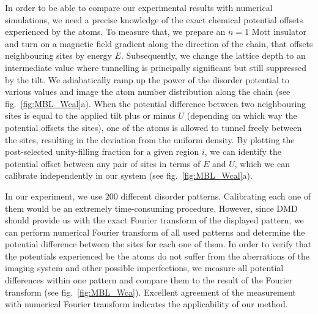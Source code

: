 In order to be able to compare our experimental results with numerical simulations, we need a precise knowledge of the exact chemical potential offsets experienced by the atoms. To measure that, we prepare an $n=1$ Mott insulator and turn on a magnetic field gradient along the direction of the chain, that offsets neighbouring sites by energy $E$. Subsequently, we change the lattice depth to an intermediate value where tunnelling is principally significant but still suppressed by the tilt. We adiabatically ramp up the power of the disorder potential to various values and image the atom number distribution along the chain (see fig.~\ref{fig:MBL_Wcal}a). When the potential difference between two neighbouring sites is equal to the applied tilt plus or minus $U$ (depending on which way the potential offsets the sites), one of the atoms is allowed to tunnel freely between the sites, resulting in the deviation from the uniform density. By plotting the post-selected unity-filling fraction for a given region $i$, we can identify the potential offset between any pair of sites in terms of $E$ and $U$, which we can calibrate independently in our system \cite{Ma2011} (see fig.~\ref{fig:MBL_Wcal}a).

In our experiment, we use $200$ different disorder patterns. Calibrating each one of them would be an extremely time-consuming procedure. However, since DMD should provide us with the exact Fourier transform of the displayed pattern, we can perform numerical Fourier transform of all used patterns and determine the potential difference between the sites for each one of them. In order to verify that the potentials experienced be the atoms do not suffer from the aberrations of the imaging system and other possible imperfections, we measure all potential differences within one pattern and compare them to the result of the Fourier transform (see fig.~\ref{fig:MBL_Wca}). Excellent agreement of the measurement with numerical Fourier transform indicates the applicability of our method.

